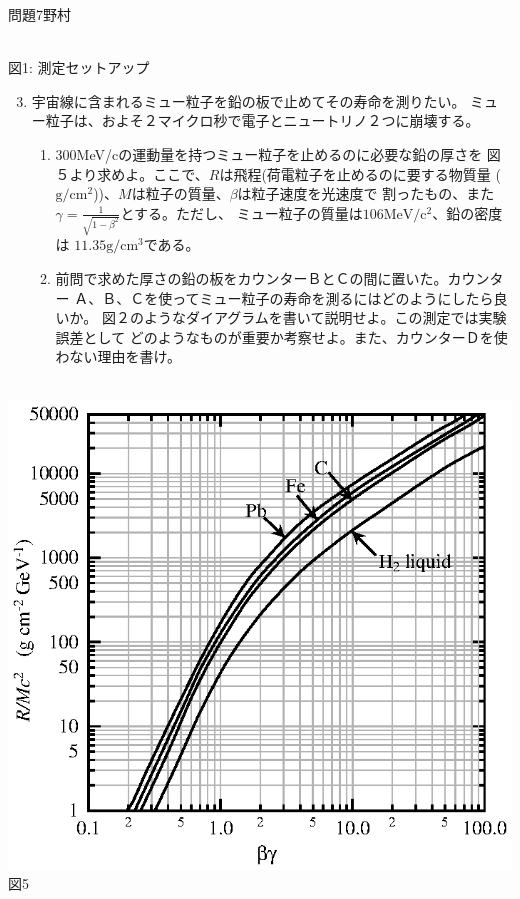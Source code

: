\documentclass[fleqn]{jbook}
\begin{document}
\begin{question}{問題7}{野村}
{\begin{enumerate}
\begin{enumerate}
\end{enumerate}
\end{enumerate}}
\parbox{.3\textwidth}{\begin{center}
\\
図1: 測定セットアップ

\end{center}}
\begin{center}

\end{center}
\begin{enumerate}
\setcounter{enumi}{2}
\item
宇宙線に含まれるミュー粒子を鉛の板で止めてその寿命を測りたい。
ミュー粒子は、およそ２マイクロ秒で電子とニュートリノ２つに崩壊する。
\begin{enumerate}
\item
300MeV/cの運動量を持つミュー粒子を止めるのに必要な鉛の厚さを
図５より求めよ。ここで、$R$は飛程(荷電粒子を止めるのに要する物質量
($\mathrm{g/cm^2}$))、$M$は粒子の質量、$\beta$は粒子速度を光速度で
割ったもの、また$\gamma=\frac{1}{\sqrt{1-\beta^2}}$とする。ただし、
ミュー粒子の質量は$106\mathrm{MeV/c^2}$、鉛の密度は
$11.35\mathrm{g/cm^3}$である。

\item
前問で求めた厚さの鉛の板をカウンターＢとＣの間に置いた。カウンター
Ａ、Ｂ、Ｃを使ってミュー粒子の寿命を測るにはどのようにしたら良いか。
図２のようなダイアグラムを書いて説明せよ。この測定では実験誤差として
どのようなものが重要か考察せよ。また、カウンターＤを使わない理由を書け。

\end{enumerate}\end{enumerate}

\begin{center}
\\
\qquad
\includegraphics[width=.35\textwidth]{2000physQ7_1.eps}図5
\end{center}
\end{question}
\end{document}
